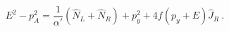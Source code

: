 \begin{equation}
 E^2 - p_A^2 = \frac{1}{\alpha '} (\hat N_L + \hat N_R) + p_y^2 
 + 4 f (p_y + E) \hat J_R ~. 
\end{equation}

